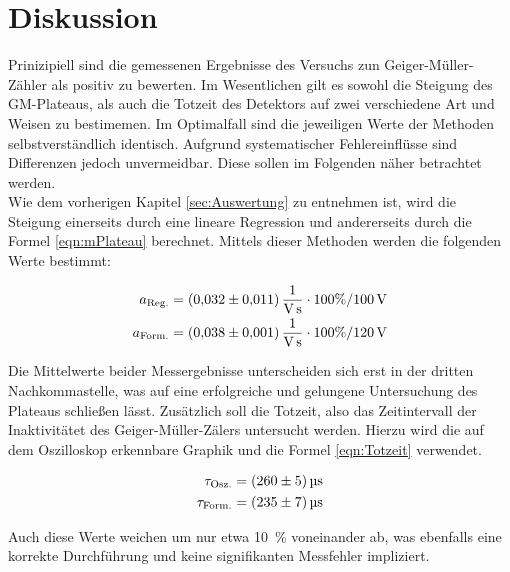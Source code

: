 %

%

\section{Diskussion}
\label{sec:Diskussion}

\noindent Prinizipiell sind die gemessenen Ergebnisse des Versuchs zun Geiger-Müller-Zähler als positiv zu bewerten. Im Wesentlichen 
gilt es sowohl die Steigung des GM-Plateaus, als auch die Totzeit des Detektors auf zwei verschiedene Art und Weisen zu bestimemen. 
Im Optimalfall sind die jeweiligen Werte der Methoden selbstverständlich identisch. Aufgrund systematischer Fehlereinflüsse
sind Differenzen jedoch unvermeidbar. Diese sollen im Folgenden näher betrachtet werden.\\

\noindent Wie dem vorherigen Kapitel \ref{sec:Auswertung} zu entnehmen ist, wird die Steigung einerseits durch eine lineare 
Regression und andererseits durch die Formel \eqref{eqn:mPlateau} berechnet. Mittels dieser Methoden werden die folgenden 
Werte bestimmt:

\begin{align*}
    a_\text{Reg.} &= \qty{0.032\pm0.011}{\per \volt \per \second} \cdot 100\% / \qty{100}{\volt}\\
    a_\text{Form.} &= \qty{0.038\pm0.001}{\per \volt \per \second} \cdot 100\% / \qty{120}{\volt}
\end{align*}

\noindent Die Mittelwerte beider Messergebnisse unterscheiden sich erst in der dritten Nachkommastelle, was auf eine erfolgreiche 
und gelungene Untersuchung des Plateaus schließen lässt. Zusätzlich soll die Totzeit, also das Zeitintervall der Inaktivitätet des 
Geiger-Müller-Zälers untersucht werden. Hierzu wird die auf dem Oszilloskop erkennbare Graphik und die Formel \eqref{eqn:Totzeit}
verwendet.

\begin{align*}
    \tau_\text{Osz.} &= \qty{260\pm5}{\micro \second}\\
    \tau_\text{Form.} &= \qty{235\pm7}{\micro \second}
\end{align*}

\noindent Auch diese Werte weichen um nur etwa \qty{10}{\percent} voneinander ab, was ebenfalls eine korrekte Durchführung und keine 
signifikanten Messfehler impliziert.\\

